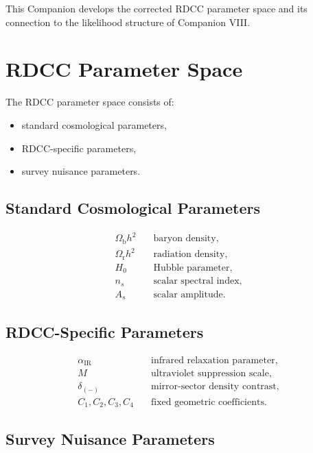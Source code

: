\documentclass[11pt,a4paper]{article}
\begin{document}
This Companion develops the corrected RDCC parameter space and its connection to
the likelihood structure of Companion VIII.

\section[RDCC Parameter Space]{RDCC Parameter Space}

The RDCC parameter space consists of:
\begin{itemize}[leftmargin=0.8cm]
  \item standard cosmological parameters,
  \item RDCC-specific parameters,
  \item survey nuisance parameters.
\end{itemize}

\subsection[Standard Parameters]{Standard Cosmological Parameters}

\begin{align}
\Omega_{\mathrm{b}} h^2 &\quad \text{baryon density}, \\
\Omega_{\mathrm{r}} h^2 &\quad \text{radiation density}, \\
H_0 &\quad \text{Hubble parameter}, \\
n_s &\quad \text{scalar spectral index}, \\
A_s &\quad \text{scalar amplitude}.
\end{align}

\subsection[RDCC-Specific Parameters]{RDCC-Specific Parameters}

\begin{align}
\alpha_{\mathrm{IR}} &\quad \text{infrared relaxation parameter}, \\
M &\quad \text{ultraviolet suppression scale}, \\
\delta_{(-)} &\quad \text{mirror-sector density contrast}, \\
C_1, C_2, C_3, C_4 &\quad \text{fixed geometric coefficients}.
\end{align}

\subsection[Nuisance Parameters]{Survey Nuisance Parameters}
\end{document}
